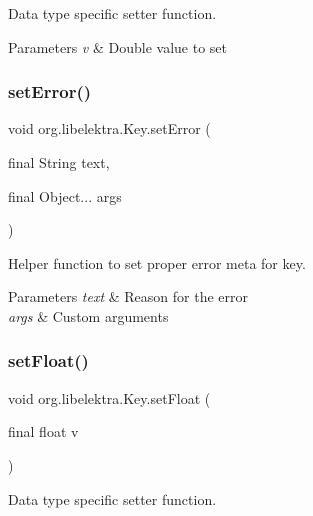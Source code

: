Data type specific setter function. 


\begin{DoxyParams}{Parameters}
{\em v} & Double value to set \\
\hline
\end{DoxyParams}
\mbox{\label{classorg_1_1libelektra_1_1Key_a1f71503902725f238f81a1211eb5d9d5}} 
\subsubsection{\texorpdfstring{setError()}{setError()}}
{\footnotesize\ttfamily void org.\+libelektra.\+Key.\+set\+Error (\begin{DoxyParamCaption}\item[{final String}]{text,  }\item[{final Object...}]{args }\end{DoxyParamCaption})\hspace{0.3cm}{\ttfamily [inline]}}



Helper function to set proper error meta for key. 


\begin{DoxyParams}{Parameters}
{\em text} & Reason for the error \\
\hline
{\em args} & Custom arguments \\
\hline
\end{DoxyParams}
\mbox{\label{classorg_1_1libelektra_1_1Key_a1436207a0efa244538c935766b8db470}} 
\subsubsection{\texorpdfstring{setFloat()}{setFloat()}}
{\footnotesize\ttfamily void org.\+libelektra.\+Key.\+set\+Float (\begin{DoxyParamCaption}\item[{final float}]{v }\end{DoxyParamCaption})\hspace{0.3cm}{\ttfamily [inline]}}



Data type specific setter function. 


